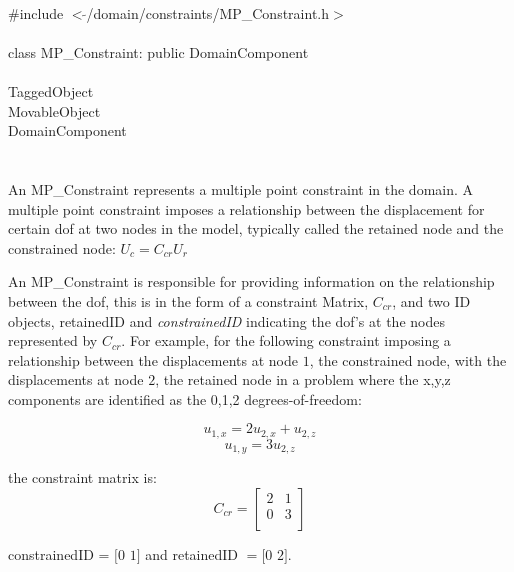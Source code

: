 
   \\
\indent \#include $<\tilde{ }$/domain/constraints/MP\_Constraint.h$>$  \\

  \\
\indent class MP\_Constraint: public DomainComponent  \\

 \\
\indent TaggedObject \\
\indent MovableObject \\
\indent\indent DomainComponent \\
\indent\indent{} \\

  \\
\indent An MP\_Constraint represents a multiple point constraint in the
domain. A multiple point constraint imposes a relationship between the
displacement for certain dof at two nodes in the model, typically called
the \p retained node and the \p constrained node: $U_c = C_{cr} U_r$


An MP\_Constraint is responsible for providing information on the
relationship between the dof, this is in the form of a constraint
Matrix, $C_{cr}$, and two ID objects, \p retainedID and {\em
constrainedID} indicating the dof's at the nodes 
represented by $C_{cr}$. For example, for the following constraint
imposing a relationship between the displacements at node $1$, the 
constrained node, with the displacements at node $2$, the retained
node in a problem where the x,y,z components are identified as the
0,1,2 degrees-of-freedom:

$$ u_{1,x} = 2 u_{2,x} + u_{2,z} $$
$$ u_{1,y} = 3 u_{2,z}$$

the constraint matrix is:
$$ C_{cr} =
\left[
\begin{array}{cc}
2 & 1  \\
0 & 3  \\
\end{array}
\right] 
$$

\p constrainedID = $[0$ $1]$ and \p retainedID $= [0$ $2]$. \\


